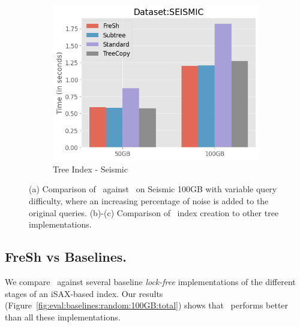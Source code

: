 \begin{figure}[htbp]
    \begin{subfigure}{0.48\textwidth}
        \includegraphics[width=\textwidth]{figures/Experiments/scale-dataset-tree-index-seismic.png}
        \caption{Tree Index - Seismic}
        \label{fig:eval:scale-dataset:tree-index:seismic}
    \end{subfigure}    

    \caption{(a) Comparison of \Fresh\ against \MESSI\ on Seismic 100GB with variable query difficulty, where an increasing percentage of noise is added to the original queries.
    (b)-(c) Comparison of \Fresh\ index creation to other tree implementations.}
    \label{fig:eval:scale-dataset:tree-index}
\end{figure}


\subsection{ FreSh vs Baselines.}
We compare \Fresh\ against several baseline {\em lock-free} implementations of the 
different stages of an iSAX-based index. 
Our results (Figure~\ref{fig:eval:baselines:random:100GB:total})
shows that \Fresh\ performs better than all these implementations.

